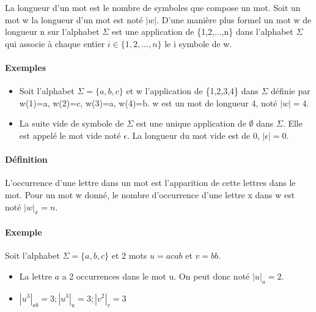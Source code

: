 La longueur d'un mot est le nombre de symboles que compose un mot. Soit un mot w la longueur d'un mot est noté $\left|w\right|$. D'une manière plus formel un mot w de longueur n sur l'alphabet $\Sigma$ est une application de \{1,2,...,n\} dans l'alphabet $\Sigma$ qui associe à chaque entier $i \in \{1,2,...,n\}$ le i symbole de w.



\paragraph{Exemples} %
\label{par:exemples}

\begin{itemize}
	\item Soit l'alphabet $\Sigma=\{a,b,c\}$ et w l'application de \{1,2,3,4\} dans $\Sigma$ définie par w(1)=a, w(2)=c, w(3)=a, w(4)=b. w est un mot de longueur 4, noté $\left|w\right| = 4$.
	\item La suite vide de symbole de $\Sigma$ est une unique application de $\emptyset$ dans $\Sigma$. Elle est appelé le mot vide noté $\epsilon$. La longueur du mot vide est de 0, $\left|\epsilon\right| = 0$.
\end{itemize}




\paragraph{Définition} %
\label{par:d_finition}

L’occurrence d'une lettre dans un mot est l'apparition de cette lettres dans le mot. Pour un mot w donné, le nombre d'occurrence d'une lettre x dans w est noté $\left|w\right|_x=n$.



\paragraph{Exemple} %
\label{par:exemple}

Soit l'alphabet $\Sigma=\{a,b,c\}$ et 2 mots $u=acab$ et $v=bb$.

\begin{itemize}
	\item La lettre $a$ a 2 occurrences dans le mot u. On peut donc noté $\left|u\right|_a=2$.
	\item $\left|u^3\right|_{ab}=3 ; \left|u^3\right|_u=3 ; \left|v^2\right|_v=3 $
\end{itemize}

